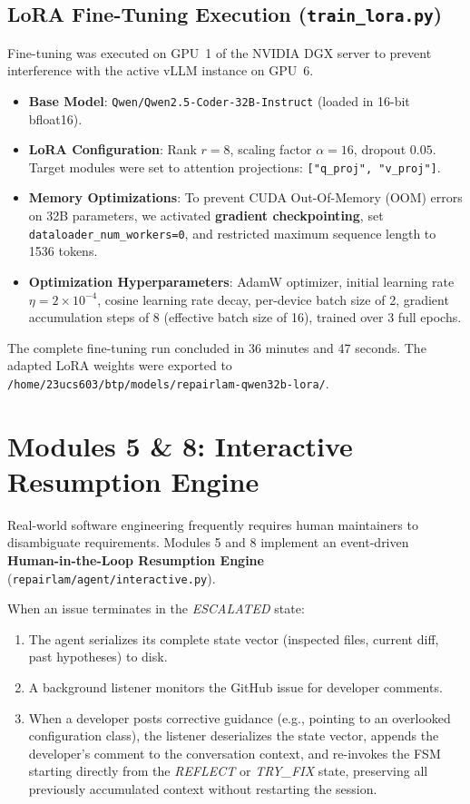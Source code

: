 \documentclass[12pt,a4paper]{report}
\begin{document}
\subsection{LoRA Fine-Tuning Execution (\texttt{train\_lora.py})}
Fine-tuning was executed on GPU~1 of the NVIDIA DGX server to prevent interference with the active vLLM instance on GPU~6.
\begin{itemize}
    \item \textbf{Base Model}: \texttt{Qwen/Qwen2.5-Coder-32B-Instruct} (loaded in 16-bit bfloat16).
    \item \textbf{LoRA Configuration}: Rank $r=8$, scaling factor $\alpha=16$, dropout $0.05$. Target modules were set to attention projections: \texttt{["q\_proj", "v\_proj"]}.
    \item \textbf{Memory Optimizations}: To prevent CUDA Out-Of-Memory (OOM) errors on 32B parameters, we activated \textbf{gradient checkpointing}, set \texttt{dataloader\_num\_workers=0}, and restricted maximum sequence length to 1536 tokens.
    \item \textbf{Optimization Hyperparameters}: AdamW optimizer, initial learning rate $\eta = 2 \times 10^{-4}$, cosine learning rate decay, per-device batch size of 2, gradient accumulation steps of 8 (effective batch size of 16), trained over 3 full epochs.
\end{itemize}
The complete fine-tuning run concluded in 36 minutes and 47 seconds. The adapted LoRA weights were exported to \texttt{/home/23ucs603/btp/models/repairlam-qwen32b-lora/}.

\section{Modules 5 \& 8: Interactive Resumption Engine}
Real-world software engineering frequently requires human maintainers to disambiguate requirements. Modules 5 and 8 implement an event-driven \textbf{Human-in-the-Loop Resumption Engine} (\texttt{repairlam/agent/interactive.py}).

When an issue terminates in the \textit{ESCALATED} state:
\begin{enumerate}
    \item The agent serializes its complete state vector (inspected files, current diff, past hypotheses) to disk.
    \item A background listener monitors the GitHub issue for developer comments.
    \item When a developer posts corrective guidance (e.g., pointing to an overlooked configuration class), the listener deserializes the state vector, appends the developer's comment to the conversation context, and re-invokes the FSM starting directly from the \textit{REFLECT} or \textit{TRY\_FIX} state, preserving all previously accumulated context without restarting the session.
\end{enumerate}
\end{document}
